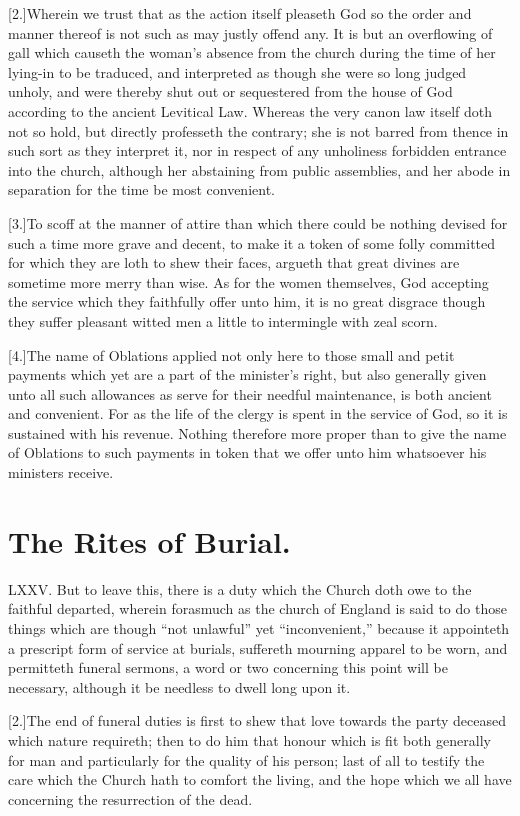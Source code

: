 [2.]Wherein we trust that as the action itself pleaseth God so the order and manner thereof is not such as may justly offend any. It is but an overflowing of gall which causeth the woman’s absence from the church during the time of her lying-in to be traduced, and interpreted as though  she were so long judged unholy, and were thereby shut out or sequestered from the house of God according to the ancient Levitical Law. Whereas the very canon law itself doth not so hold, but directly professeth the contrary; she is not barred from thence in such sort as they interpret it, nor in respect of any unholiness forbidden entrance into the church, although her abstaining from public  assemblies,
 and her abode in separation for the time be most convenient.

[3.]To scoff at the manner of attire than which there could be nothing devised for such a time more grave and decent, to make it a token of some folly committed for which they are loth to shew their faces, argueth that great divines are sometime more merry than wise. As for the women themselves, God accepting the service which they faithfully offer unto him, it is no great disgrace though they suffer pleasant witted men a little to intermingle with zeal scorn.

[4.]The name of Oblations applied not only here to those small and petit payments which yet are a part of the minister’s  right,
 but also generally given unto all such allowances as serve for their needful maintenance, is both ancient and convenient. For as the life of the clergy is spent in the service of God, so it is sustained with his revenue. Nothing therefore more proper than to give the name of Oblations to such payments in token that we offer unto him whatsoever his ministers receive.


\section*{The Rites of Burial.}
LXXV. But to leave this, there is a duty which the Church doth owe to the faithful departed, wherein forasmuch as the church of England is said to do those things which are though “not unlawful” yet “inconvenient,” because it appointeth a prescript form of service at burials, suffereth mourning apparel to be worn, and permitteth funeral sermons, a word or two concerning this point will be necessary, although it be needless to dwell long upon it.

[2.]The end of funeral duties is first to shew that love towards the party deceased which nature requireth; then to do him that honour which is fit both generally for man and particularly for the quality of his person; last of all to testify the care which the Church hath to comfort the living, and the hope which we all have concerning the resurrection of the dead.

